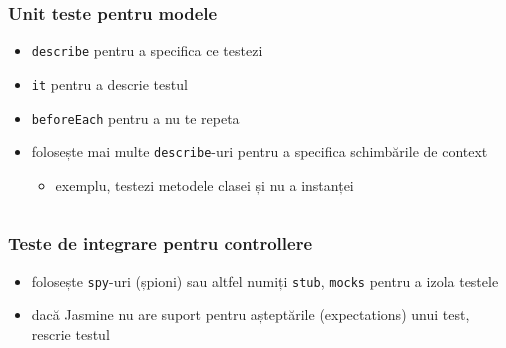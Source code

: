 \documentclass[compress]{beamer}
\begin{document}
\begin{frame}

\frametitle{Unit teste pentru modele}

\begin{itemize}[<+->]
  \item \texttt{describe} pentru a specifica ce testezi
  \item \texttt{it} pentru a descrie testul
  \item \texttt{beforeEach} pentru a nu te repeta
  \item folosește mai multe \texttt{describe}-uri pentru a specifica schimbările de context
  \begin{itemize}[<+->]
    \item exemplu, testezi metodele clasei și nu a instanței
  \end{itemize}
\end{itemize}

\inputminted[fontsize=\tiny,gobble=2,linenos=true,firstline=3,lastline=23]{javascript}{code/js/app/test/model/article.js}

\end{frame}

\begin{frame}

\frametitle{Teste de integrare pentru controllere}

\begin{itemize}[<+->]
  \item folosește \texttt{spy}-uri (șpioni) sau altfel numiți \texttt{stub}, \texttt{mocks} pentru a izola testele
  \item dacă Jasmine nu are suport pentru așteptările (expectations) unui test, rescrie testul
\end{itemize}

\inputminted[fontsize=\tiny,gobble=2,linenos=true,firstline=6,lastline=29]{javascript}{code/js/app/test/controller/publish.js}

\end{frame}
\end{document}
